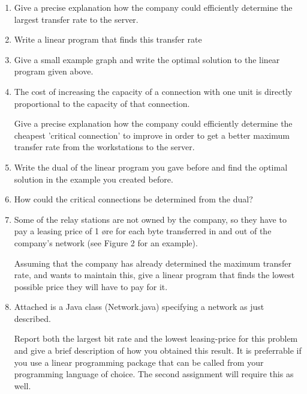\documentclass{article}
\begin{document}
\newpage
\begin{enumerate}
\item Give a precise explanation how the company could efficiently determine
the largest transfer rate to the server. 

\item Write a linear program that finds this transfer rate

\item Give a small example graph and write the optimal solution to the
linear program given above.  

\item The cost of increasing the capacity of a connection with one unit is
directly proportional to the capacity of that connection.  

Give a precise explanation how the company could efficiently determine
the cheapest 'critical connection' to improve in order to get a better
maximum transfer rate from the workstations to the server.  

\item Write the dual of the linear program you gave before and find the
optimal solution in the example you created before.   

\item How could the critical connections be determined from the dual?

\item Some of the relay stations are not owned by the company, so they have
to pay a leasing price of 1 øre for each byte transferred in and out
of the company’s network (see Figure 2 for an example).  

Assuming that the company has already determined the maximum transfer
rate, and wants to maintain this, give a linear program that finds the
lowest possible price they will have to pay for it.

\item Attached is a Java class (Network.java) specifying a network as just
described.

Report both the largest bit rate and the lowest leasing-price for this
problem and give a brief description of how you obtained this
result. It is preferrable if you use a linear programming package that
can be called from your programming language of choice. The second
assignment will require this as well. 
\end{enumerate}
\end{document}
